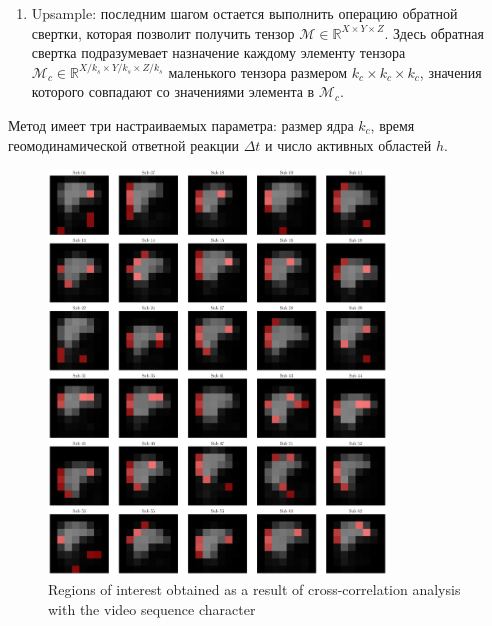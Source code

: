 \documentclass[a4paper, 12pt]{extarticle}
\begin{document}
\begin{enumerate}
	\item Upsample: последним шагом остается выполнить операцию обратной свертки, которая позволит получить тензор $\mathcal{M} \in \mathbb{R}^{X \times Y \times Z}$. Здесь обратная свертка подразумевает назначение каждому элементу тензора $\mathcal{M}_c \in \mathbb{R}^{X/ k_s \times Y/ k_s \times Z/ k_s}$ маленького тензора размером $k_c \times k_c \times k_c$, значения которого совпадают со значениями элемента в $\mathcal{M}_c$.
	
\end{enumerate}
Метод имеет три настраиваемых параметра: размер ядра $k_c$, время геомодинамической ответной реакции 
$\Delta t$ и число активных областей $h$.



\begin{figure}[h!]
    \centering
    \includegraphics[width=0.8\textwidth]{cross_correlations.pdf}
    \caption{Regions of interest obtained as a result of cross-correlation analysis with the video sequence character}
\end{figure}
\end{document}

